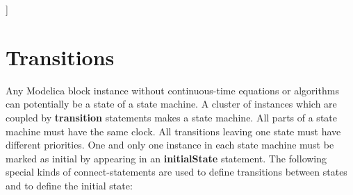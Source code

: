 {]}

\section{Transitions}

Any Modelica block instance without continuous-time equations or
algorithms can potentially be a state of a state machine. A cluster of
instances which are coupled by \textbf{transition} statements makes a
state machine. All parts of a state machine must have the same clock.
All transitions leaving one state must have different priorities. One
and only one instance in each state machine must be marked as initial by
appearing in an \textbf{initialState} statement. The following special
kinds of connect-statements are used to define transitions between
states and to define the initial state:

